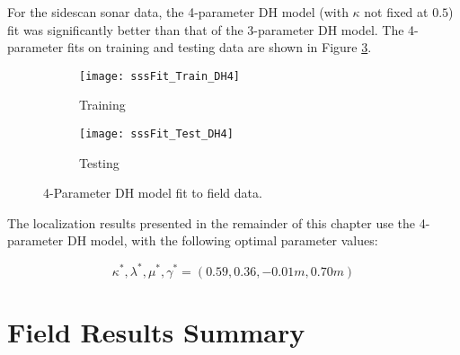 For the sidescan sonar data, the 4-parameter DH model (with $\kappa$ not fixed at $0.5$) fit was significantly better than that of the 3-parameter DH model.  
The 4-parameter fits on training and testing data are shown in Figure \ref{fig:sss4paramFit}.

\begin{figure} [!h]
	\centering
	\begin{subfigure}[b]{0.48\textwidth}
                \texttt{[image: sssFit\_Train\_DH4]}
                \caption{Training}
                \label{}
	\end{subfigure}
  	\centering
	\begin{subfigure}[b]{0.48\textwidth}
                \texttt{[image: sssFit\_Test\_DH4]}
		\caption{Testing}
		\label{}
  	\end{subfigure}
	\caption{4-Parameter DH model fit to field data. }
	\label{fig:sss4paramFit}
\end{figure}

The localization results presented in the remainder of this chapter use the 4-parameter DH model, with the following optimal parameter values:

\large
\begin{equation} 
\kappa^*, \lambda^*, \mu^*, \gamma^* = (0.59, 0.36, -0.01m, 0.70m)
\label{eq:fitParamsAUV}
\end{equation}
\normalsize

\section{Field Results Summary}
\label{auv.Results}

